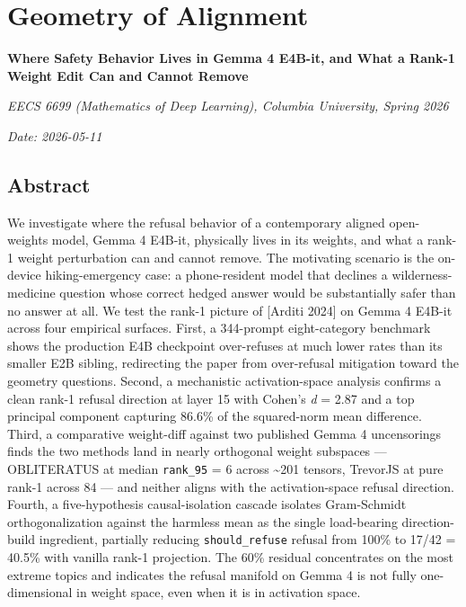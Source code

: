 \documentclass[
  11pt,
]{article}
\author{}
\date{}
\begin{document}
{
\setcounter{tocdepth}{2}
\tableofcontents
}
\section{Geometry of Alignment}\label{geometry-of-alignment}

\textbf{Where Safety Behavior Lives in Gemma 4 E4B-it, and What a Rank-1
Weight Edit Can and Cannot Remove}

\emph{EECS 6699 (Mathematics of Deep Learning), Columbia University,
Spring 2026}

\emph{Date: 2026-05-11}

\subsection{Abstract}\label{abstract}

We investigate where the refusal behavior of a contemporary aligned
open-weights model, Gemma 4 E4B-it, physically lives in its weights, and
what a rank-1 weight perturbation can and cannot remove. The motivating
scenario is the on-device hiking-emergency case: a phone-resident model
that declines a wilderness-medicine question whose correct hedged answer
would be substantially safer than no answer at all. We test the rank-1
picture of {[}Arditi 2024{]} on Gemma 4 E4B-it across four empirical
surfaces. First, a 344-prompt eight-category benchmark shows the
production E4B checkpoint over-refuses at much lower rates than its
smaller E2B sibling, redirecting the paper from over-refusal mitigation
toward the geometry questions. Second, a mechanistic activation-space
analysis confirms a clean rank-1 refusal direction at layer 15 with
Cohen's \emph{d} = 2.87 and a top principal component capturing 86.6\%
of the squared-norm mean difference. Third, a comparative weight-diff
against two published Gemma 4 uncensorings finds the two methods land in
nearly orthogonal weight subspaces --- OBLITERATUS at median
\texttt{rank\_95} = 6 across \textasciitilde201 tensors, TrevorJS at
pure rank-1 across 84 --- and neither aligns with the activation-space
refusal direction. Fourth, a five-hypothesis causal-isolation cascade
isolates Gram-Schmidt orthogonalization against the harmless mean as the
single load-bearing direction-build ingredient, partially reducing
\texttt{should\_refuse} refusal from 100\% to 17/42 = 40.5\% with
vanilla rank-1 projection. The 60\% residual concentrates on the most
extreme topics and indicates the refusal manifold on Gemma 4 is not
fully one-dimensional in weight space, even when it is in activation
space.
\end{document}
